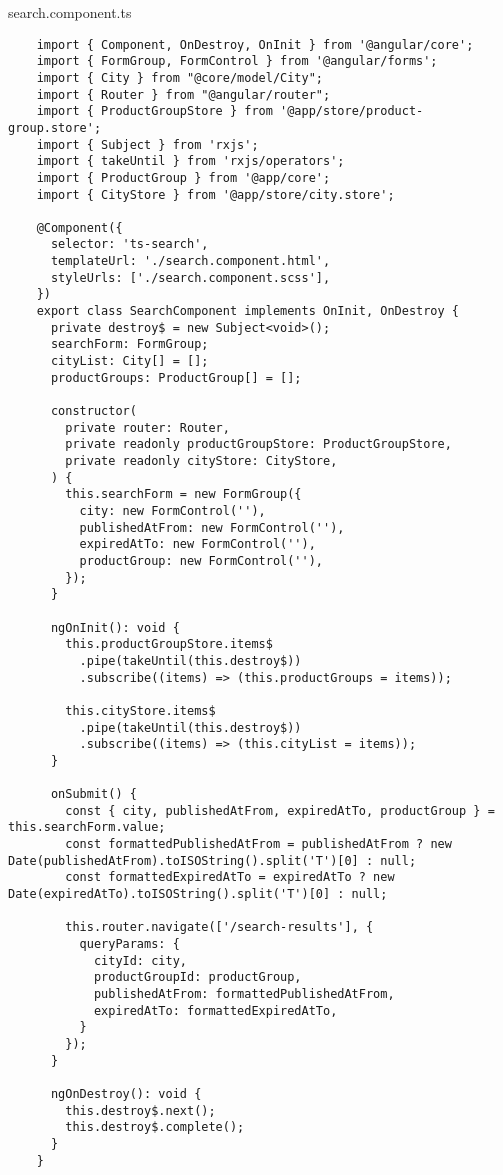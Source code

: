 search.component.ts
\begin{lstlisting}
    import { Component, OnDestroy, OnInit } from '@angular/core';
    import { FormGroup, FormControl } from '@angular/forms';
    import { City } from "@core/model/City";
    import { Router } from "@angular/router";
    import { ProductGroupStore } from '@app/store/product-group.store';
    import { Subject } from 'rxjs';
    import { takeUntil } from 'rxjs/operators';
    import { ProductGroup } from '@app/core';
    import { CityStore } from '@app/store/city.store';
    
    @Component({
      selector: 'ts-search',
      templateUrl: './search.component.html',
      styleUrls: ['./search.component.scss'],
    })
    export class SearchComponent implements OnInit, OnDestroy {
      private destroy$ = new Subject<void>();
      searchForm: FormGroup;
      cityList: City[] = [];
      productGroups: ProductGroup[] = [];
    
      constructor(
        private router: Router,
        private readonly productGroupStore: ProductGroupStore,
        private readonly cityStore: CityStore,
      ) {
        this.searchForm = new FormGroup({
          city: new FormControl(''),
          publishedAtFrom: new FormControl(''),
          expiredAtTo: new FormControl(''),
          productGroup: new FormControl(''),
        });
      }
    
      ngOnInit(): void {
        this.productGroupStore.items$
          .pipe(takeUntil(this.destroy$))
          .subscribe((items) => (this.productGroups = items));
    
        this.cityStore.items$
          .pipe(takeUntil(this.destroy$))
          .subscribe((items) => (this.cityList = items));
      }
    
      onSubmit() {
        const { city, publishedAtFrom, expiredAtTo, productGroup } = this.searchForm.value;
        const formattedPublishedAtFrom = publishedAtFrom ? new Date(publishedAtFrom).toISOString().split('T')[0] : null;
        const formattedExpiredAtTo = expiredAtTo ? new Date(expiredAtTo).toISOString().split('T')[0] : null;
    
        this.router.navigate(['/search-results'], {
          queryParams: {
            cityId: city,
            productGroupId: productGroup,
            publishedAtFrom: formattedPublishedAtFrom,
            expiredAtTo: formattedExpiredAtTo,
          }
        });
      }
    
      ngOnDestroy(): void {
        this.destroy$.next();
        this.destroy$.complete();
      }
    }    
\end{lstlisting}

